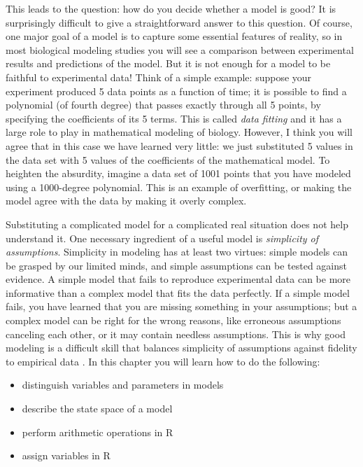 \documentclass[
  letterpaper,
  DIV=11,
  numbers=noendperiod]{scrreprt}
\begin{document}
This leads to the question: how do you decide whether a model is good?
It is surprisingly difficult to give a straightforward answer to this
question. Of course, one major goal of a model is to capture some
essential features of reality, so in most biological modeling studies
you will see a comparison between experimental results and predictions
of the model. But it is not enough for a model to be faithful to
experimental data! Think of a simple example: suppose your experiment
produced 5 data points as a function of time; it is possible to find a
polynomial (of fourth degree) that passes exactly through all 5 points,
by specifying the coefficients of its 5 terms. This is called
 \emph{data fitting} and it has a large role to play in
mathematical modeling of biology. However, I think you will agree that
in this case we have learned very little: we just substituted 5 values
in the data set with 5 values of the coefficients of the mathematical
model. To heighten the absurdity, imagine a data set of 1001 points that
you have modeled using a 1000-degree polynomial. This is an example of
overfitting, or making the model agree with the data by making it overly
complex.

Substituting a complicated model for a complicated real situation does
not help understand it. One necessary ingredient of a useful model is
\emph{simplicity of assumptions}. Simplicity in modeling has at least
two virtues: simple models can be grasped by our limited minds, and
simple assumptions can be tested against evidence. A simple model that
fails to reproduce experimental data can be more informative than a
complex model that fits the data perfectly. If a simple model fails, you
have learned that you are missing something in your assumptions; but a
complex model can be right for the wrong reasons, like erroneous
assumptions canceling each other, or it may contain needless
assumptions. This is why good modeling is a difficult skill that
balances simplicity of assumptions against fidelity to empirical data
\cite{cohen_mathematics_2004}. In this chapter you will learn how to do
the following:

\begin{itemize}
\item
  distinguish variables and parameters in models
\item
  describe the state space of a model
\item
  perform arithmetic operations in R
\item
  assign variables in R
\end{itemize}
\end{document}
